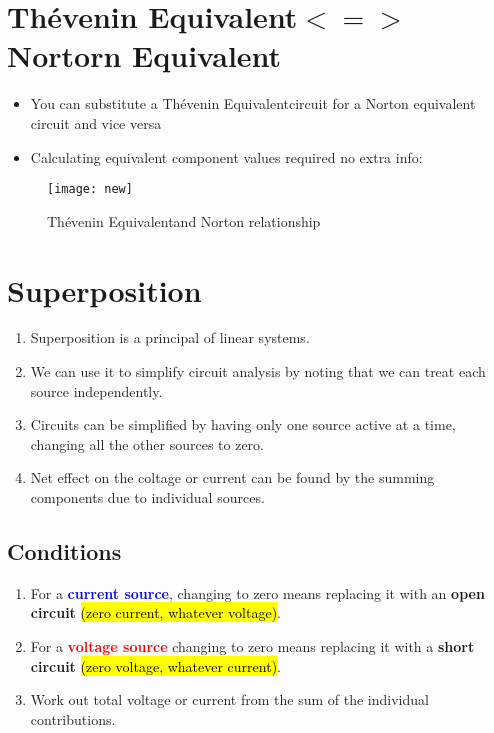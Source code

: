 \documentclass[11pt,a4paper, twocolumn]{article}
\newcommand{\thev}{Th\'{e}venin Equivalent}
\begin{document}
\section {\textbf{\thev $<=>$ Nortorn Equivalent}}

	\begin{itemize}
	\item You can substitute a \thev circuit for a Norton equivalent circuit and vice versa
	\item	Calculating equivalent component values required no extra info:
	
	\end{itemize}
	\begin{figure}[!h]
	\texttt{[image: new]}
	\caption{\thev and Norton relationship}
	\end{figure}
	


\section{Superposition}

	\begin{enumerate}
	\item 	Superposition is a principal of linear systems.
	\item We can use it to simplify circuit analysis by noting that we can treat each source independently. 
	\item Circuits can be simplified by having only one source active at a time, changing all the other sources to zero.
	\item Net effect on the coltage or current can be found by the summing components due to individual sources.
	\end{enumerate}
	\subsection{Conditions}
	\begin{enumerate}
	
	\item	For a \textcolor{blue}{\textbf{current source}}, changing to zero means replacing it with an \textbf{open circuit} \hl{(zero current, whatever voltage)}.
	\item For a \textcolor{red}{\textbf{voltage source}} changing to zero means replacing it with a \textbf{short circuit} \hl{(zero voltage, whatever current)}.
	\item Work out total voltage or current from the sum of the individual contributions.
	\end{enumerate}
\end{document}
